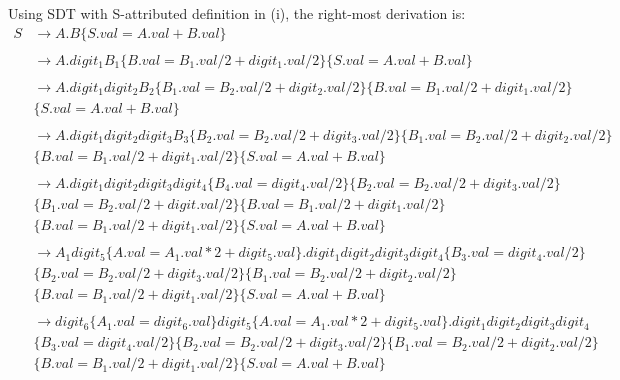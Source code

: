 \documentclass[a4paper]{exam}
\begin{document}
\begin{enumerate}
\begin{solution}
Using SDT with S-attributed definition in (i), the right-most derivation is:
\begin{equation}
    \begin{aligned}
    S &\rightarrow A.B\{S.val=A.val+B.val\} \\
    \\
    &\rightarrow A.digit_{1}B_{1}\{B.val=B_{1}.val/2+digit_{1}.val/2\}\{S.val=A.val+B.val\} \\ 
    \\
    &\rightarrow A.digit_{1}digit_{2}B_{2}\{B_{1}.val=B_{2}.val/2+digit_{2}.val/2\}\{B.val=B_{1}.val/2+digit_{1}.val/2\}\\ &\{S.val=A.val+B.val\} \\
    \\
    &\rightarrow A.digit_{1}digit_{2}digit_{3}B_{3}\{B_{2}.val = B_{2}.val/2+digit_{3}.val/2\}\{B_{1}.val=B_{2}.val/2+digit_{2}.val/2\}\\ &\{B.val=B_{1}.val/2+digit_{1}.val/2\}\{S.val = A.val+B.val\}\\
    \\
    &\rightarrow A.digit_{1}digit_{2}digit_{3}digit_{4}\{B_{4}.val=digit_{4}.val/2\}\{B_{2}.val=B_{2}.val/2+digit_{3}.val/2\}\\ &\{B_{1}.val=B_{2}.val/2+digit.val/2\}\{B.val=B_{1}.val/2+digit_{1}.val/2\}\\ &\{B.val=B_{1}.val/2+digit_{1}.val/2\}\{S.val=A.val+B.val\} \\
    \\
    &\rightarrow A_{1}digit_{5}\{A.val=A_{1}.val*2+digit_{5}.val\}.digit_{1}digit_{2}digit_{3}digit_{4}\{B_{3}.val=digit_{4}.val/2\}\\ &\{B_{2}.val=B_{2}.val/2+digit_{3}.val/2\}\{B_{1}.val=B_{2}.val/2+digit_{2}.val/2\}\\ 
    &\{B.val=B_{1}.val/2+digit_{1}.val/2\}\{S.val=A.val+B.val\}\\
    \\
    &\rightarrow digit_{6}\{A_{1}.val=digit_{6}.val\}digit_{5}\{A.val=A_{1}.val*2+digit_{5}.val\}.digit_{1}digit_{2}digit_{3}digit_{4}\\ &\{B_{3}.val=digit_{4}.val/2\}\{B_{2}.val=B_{2}.val/2+digit_{3}.val/2\}\{B_{1}.val=B_{2}.val/2+digit_{2}.val/2\}\\ 
    &\{B.val=B_{1}.val/2+digit_{1}.val/2\}\{S.val=A.val+B.val\} 
    \end{aligned}
\end{equation}
\end{solution}
\end{enumerate}
\end{document}
